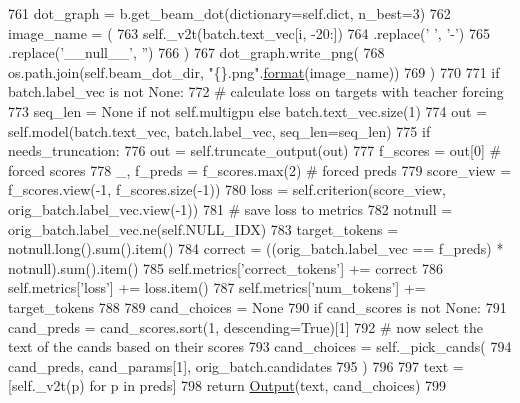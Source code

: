 \begin{DoxyCode}
761                     dot\_graph = b.get\_beam\_dot(dictionary=self.dict, n\_best=3)
762                     image\_name = (
763                         self.\_v2t(batch.text\_vec[i, -20:])
764                         .replace(\textcolor{stringliteral}{' '}, \textcolor{stringliteral}{'-'})
765                         .replace(\textcolor{stringliteral}{'\_\_null\_\_'}, \textcolor{stringliteral}{''})
766                     )
767                     dot\_graph.write\_png(
768                         os.path.join(self.beam\_dot\_dir, \textcolor{stringliteral}{"\{\}.png"}.\hyperlink{namespaceparlai_1_1chat__service_1_1services_1_1messenger_1_1shared__utils_a32e2e2022b824fbaf80c747160b52a76}{format}(image\_name))
769                     )
770 
771         \textcolor{keywordflow}{if} batch.label\_vec \textcolor{keywordflow}{is} \textcolor{keywordflow}{not} \textcolor{keywordtype}{None}:
772             \textcolor{comment}{# calculate loss on targets with teacher forcing}
773             seq\_len = \textcolor{keywordtype}{None} \textcolor{keywordflow}{if} \textcolor{keywordflow}{not} self.multigpu \textcolor{keywordflow}{else} batch.text\_vec.size(1)
774             out = self.model(batch.text\_vec, batch.label\_vec, seq\_len=seq\_len)
775             \textcolor{keywordflow}{if} needs\_truncation:
776                 out = self.truncate\_output(out)
777             f\_scores = out[0]  \textcolor{comment}{# forced scores}
778             \_, f\_preds = f\_scores.max(2)  \textcolor{comment}{# forced preds}
779             score\_view = f\_scores.view(-1, f\_scores.size(-1))
780             loss = self.criterion(score\_view, orig\_batch.label\_vec.view(-1))
781             \textcolor{comment}{# save loss to metrics}
782             notnull = orig\_batch.label\_vec.ne(self.NULL\_IDX)
783             target\_tokens = notnull.long().sum().item()
784             correct = ((orig\_batch.label\_vec == f\_preds) * notnull).sum().item()
785             self.metrics[\textcolor{stringliteral}{'correct\_tokens'}] += correct
786             self.metrics[\textcolor{stringliteral}{'loss'}] += loss.item()
787             self.metrics[\textcolor{stringliteral}{'num\_tokens'}] += target\_tokens
788 
789         cand\_choices = \textcolor{keywordtype}{None}
790         \textcolor{keywordflow}{if} cand\_scores \textcolor{keywordflow}{is} \textcolor{keywordflow}{not} \textcolor{keywordtype}{None}:
791             cand\_preds = cand\_scores.sort(1, descending=\textcolor{keyword}{True})[1]
792             \textcolor{comment}{# now select the text of the cands based on their scores}
793             cand\_choices = self.\_pick\_cands(
794                 cand\_preds, cand\_params[1], orig\_batch.candidates
795             )
796 
797         text = [self.\_v2t(p) \textcolor{keywordflow}{for} p \textcolor{keywordflow}{in} preds]
798         \textcolor{keywordflow}{return} \hyperlink{namespaceparlai_1_1agents_1_1legacy__agents_1_1seq2seq_1_1torch__agent__v1_a2689006ea97d09413fb242f984bd8016}{Output}(text, cand\_choices)
799 
\end{DoxyCode}
